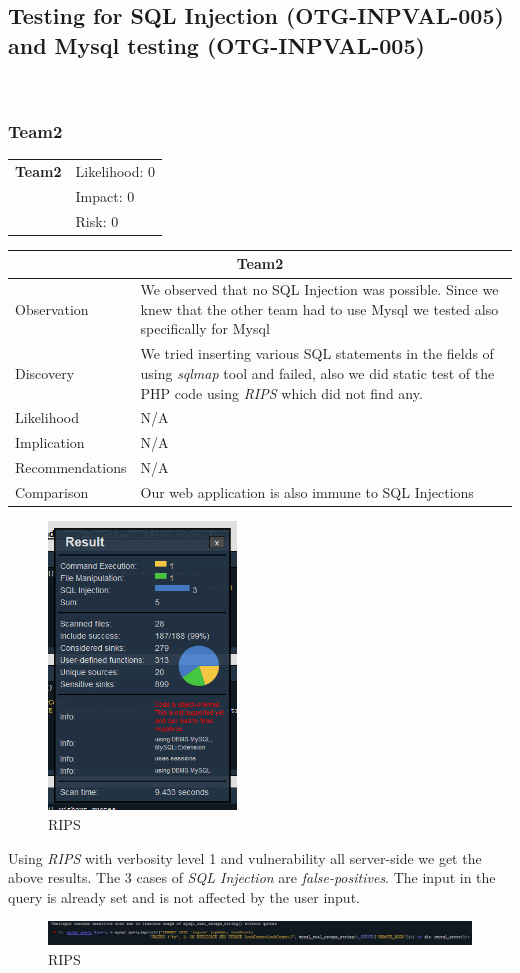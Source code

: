 \documentclass[headsepline,footsepline,footinclude=false,oneside,fontsize=11pt,paper=a4,listof=totoc,bibliography=totoc]{scrbook} %
\begin{document}
\pagebreak
\subsection{Testing for SQL Injection (OTG-INPVAL-005) and Mysql testing (OTG-INPVAL-005)}\

\subsubsection{Team2}
\begin{tabular}{cR{12cm}}
	\textbf{Team2} & Likelihood: 0\\& Impact: 0\\& Risk: 0
\end{tabular}

\begin{tabular}{ l|p{11cm}  }
	\hline
	\multicolumn{2}{c}{\textbf{Team2}} \\
	\hline
	Observation   & We observed that no SQL Injection was possible. Since we knew that the other team had
	to use Mysql we tested also specifically for Mysql \\
	Discovery  & We tried inserting various SQL statements in the fields of using \textit{sqlmap} tool and failed, also we did static test of the PHP code using \textit{RIPS} which did not find any.\\
	Likelihood & N/A \\
	Implication    & N/A \\
	Recommendations & N/A \\
	Comparison& Our web application is also immune to SQL Injections \\
	\hline
\end{tabular}
\begin{figure}[ht!]
	\centering
	\includegraphics[width=50mm]{logos/RIPS2.jpg}
	\caption{RIPS \label{overflow}}
\end{figure}
Using \textit{RIPS} with verbosity level 1  and vulnerability all server-side we get the above results.
The 3 cases of \textit{SQL Injection} are \textit{false-positives}. The input in the query is already set and is not affected by the user input.
\begin{figure}[ht!]
	\centering
	\includegraphics[width=150mm]{logos/Injection1.jpg}
	\caption{RIPS \label{overflow}}
\end{figure}
\end{document}
